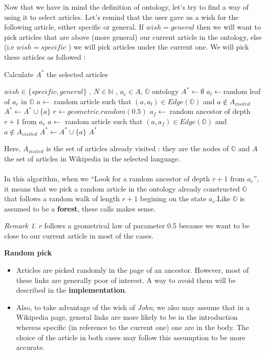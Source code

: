 \documentclass[11pt]{article}
\theoremstyle{plain}
\theoremstyle{definition}
\theoremstyle{remark}
\newtheorem*{rem}{Remark}
\begin{document}
Now that we have in mind the definition of ontology, let's try to find a way of using it to select articles. Let's remind that the user gave us a wish for the following article, either specific or general. If $wish = general$ then we will want to pick articles that are above (more general) our current article in the ontology, else (i.e $wish=specific$ ) we will pick articles under the current one. We will pick these articles as followed :

\begin{algorithm}
  \caption{Calculate $A^*$ the selected articles}
  \begin{algorithmic}
    \REQUIRE $wish \in \{specific , general\}$ , $N \in \mathbb{N}$ , $a_c \in A$, $\mathbb{O}$ ontology
    \STATE $A^* \leftarrow \emptyset$
    \STATE $a_l \leftarrow $random leaf of $a_c$ in $\mathbb{O}$
    \STATE $a \leftarrow$ random article such that $(a,a_l) \in Edge(\mathbb{O})$ and $a \notin A_{visited}$
    \STATE $ A^*  \leftarrow A^* \cup \{a\}$
    \ELSE 
    \STATE $ r \leftarrow geometric.random(0.5)$
    \STATE $a_f \leftarrow $ random ancestor of depth $r+1$ from $a_c$
    \STATE $a \leftarrow $ random article such that $(a,a_f) \in Edge(\mathbb{O})$ and $a \notin A_{visited}$
    \STATE $ A^*  \leftarrow A^* \cup \{a\}$ 
    \ENDIF
    \ENDWHILE
    \RETURN $A^*$
  \end{algorithmic}
\end{algorithm}

\newpage


Here, $A_{visited}$ is the set of articles already visited : they are the nodes of $\mathbb{O}$ and $A$ the set of articles in Wikipedia in the selected language.\\\\
In this algorithm, when we ``Look for a random ancestor of depth $r+1$ from $a_c$'', it means that we pick a random article in the ontology already constructed $\mathbb{O}$ that follows a random walk of length $r+1$ begining on the state $a_c$.Like $\mathbb{O}$ is assumed to be a \textbf{forest}, these calls makes sense. 
\begin{rem}
  $r$ follows a geometrical law of parameter 0.5 because we want to be close to our current article in most of the cases.\\
\end{rem}
\textbf{Random pick}
\begin{itemize}
\item Articles are picked randomly in the page of an ancestor. However, most of these links are generally poor of interest. A way to avoid them will be described in the \textbf{implementation}.
\item Also, to take advantage of the wish of \textit{John}, we also may assume that in a Wikipedia page, general links are more likely to be in the introduction whereas specific (in reference to the current one) one are in the body. The choice of the article in both cases may follow this assumption to be more accurate.  
\end{itemize}
\end{document}
